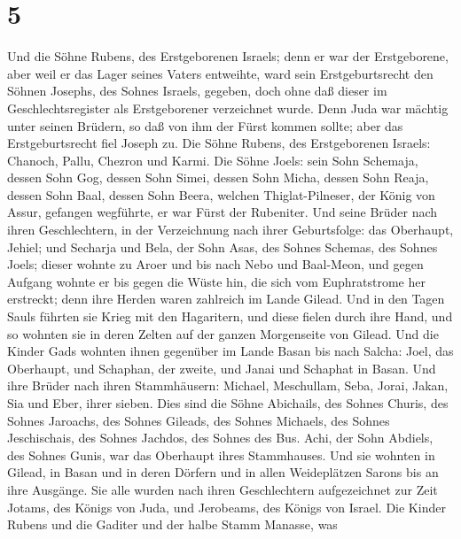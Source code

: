 \hypertarget{section-4}{%
\section{5}\label{section-4}}

 Und die Söhne Rubens, des Erstgeborenen Israels; denn er
war der Erstgeborene, aber weil er das Lager seines Vaters entweihte,
ward sein Erstgeburtsrecht den Söhnen Josephs, des Sohnes Israels,
gegeben, doch ohne daß dieser im Geschlechtsregister als Erstgeborener
verzeichnet wurde.  Denn Juda war mächtig unter seinen
Brüdern, so daß von ihm der Fürst kommen sollte; aber das
Erstgeburtsrecht fiel Joseph zu.  Die Söhne Rubens, des
Erstgeborenen Israels: Chanoch, Pallu, Chezron und Karmi. 
Die Söhne Joels: sein Sohn Schemaja, dessen Sohn Gog, dessen Sohn Simei,
 dessen Sohn Micha, dessen Sohn Reaja, dessen Sohn Baal,
 dessen Sohn Beera, welchen Thiglat-Pilneser, der König
von Assur, gefangen wegführte, er war Fürst der Rubeniter.
 Und seine Brüder nach ihren Geschlechtern, in der
Verzeichnung nach ihrer Geburtsfolge: das Oberhaupt, Jehiel;
 und Secharja und Bela, der Sohn Asas, des Sohnes Schemas,
des Sohnes Joels; dieser wohnte zu Aroer und bis nach Nebo und
Baal-Meon,  und gegen Aufgang wohnte er bis gegen die
Wüste hin, die sich vom Euphratstrome her erstreckt; denn ihre Herden
waren zahlreich im Lande Gilead.  Und in den Tagen Sauls
führten sie Krieg mit den Hagaritern, und diese fielen durch ihre Hand,
und so wohnten sie in deren Zelten auf der ganzen Morgenseite von
Gilead.  Und die Kinder Gads wohnten ihnen gegenüber im
Lande Basan bis nach Salcha:  Joel, das Oberhaupt, und
Schaphan, der zweite, und Janai und Schaphat in Basan. 
Und ihre Brüder nach ihren Stammhäusern: Michael, Meschullam, Seba,
Jorai, Jakan, Sia und Eber, ihrer sieben.  Dies sind die
Söhne Abichails, des Sohnes Churis, des Sohnes Jaroachs, des Sohnes
Gileads, des Sohnes Michaels, des Sohnes Jeschischais, des Sohnes
Jachdos, des Sohnes des Bus.  Achi, der Sohn Abdiels, des
Sohnes Gunis, war das Oberhaupt ihres Stammhauses.  Und
sie wohnten in Gilead, in Basan und in deren Dörfern und in allen
Weideplätzen Sarons bis an ihre Ausgänge.  Sie alle
wurden nach ihren Geschlechtern aufgezeichnet zur Zeit Jotams, des
Königs von Juda, und Jerobeams, des Königs von Israel. 
Die Kinder Rubens und die Gaditer und der halbe Stamm Manasse, was
